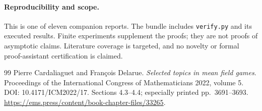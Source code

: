 \documentclass[11pt,a4paper]{article}
\theoremstyle{definition}
\theoremstyle{remark}
\begin{document}
\paragraph{Reproducibility and scope.} This is one of eleven companion reports. The bundle includes \texttt{verify.py} and its executed results. Finite experiments supplement the proofs; they are not proofs of asymptotic claims. Literature coverage is targeted, and no novelty or formal proof-assistant certification is claimed.

\begin{thebibliography}{99}
\small
{}
Pierre Cardaliaguet and Fran\c{c}ois Delarue.
\emph{Selected topics in mean field games}. Proceedings of the International Congress of Mathematicians 2022, volume 5.
DOI: 10.4171/ICM2022/17. Sections 4.3--4.4; especially printed pp.~3691--3693.
\url{https://ems.press/content/book-chapter-files/33265}.

\end{thebibliography}
\end{document}
